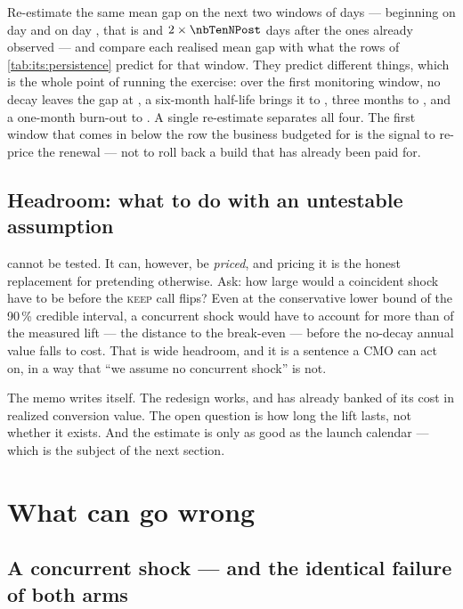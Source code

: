 Re-estimate the same mean gap on the next two windows of \nbTenNPost{} days --- beginning on day
\nbTenMonitorFirst{} and on day \nbTenMonitorSecond, that is \nbTenNPost{} and $2 \times
\nbTenNPost$ days after the ones already observed --- and compare each realised mean gap with what
the rows of \cref{tab:its:persistence} predict for that window. They predict different things, which
is the whole point of running the exercise: over the first monitoring window, no decay leaves the
gap at \pp{\nbTenBayesAvg}, a six-month half-life brings it to \pp{\nbTenMonitorGapSixm}, three
months to \pp{\nbTenMonitorGapThreem}, and a one-month burn-out to \pp{\nbTenMonitorGapOnem}. A
single re-estimate separates all four. The first window that comes in below the row the business
budgeted for is the signal to re-price the renewal --- not to roll back a build that has already
been paid for.

\subsection*{Headroom: what to do with an untestable assumption}

 cannot be tested. It can, however, be \emph{priced}, and pricing it is the
honest replacement for pretending otherwise. Ask: how large would a coincident shock have to be
before the \textsc{keep} call flips? Even at the conservative \pp{+\nbTenLiftLoNinety} lower bound
of the 90\,\% credible interval, a concurrent shock would have to account for more than
\pp{\nbTenHeadroomPp} of the measured lift --- the distance to the \pp{\nbTenBeLift} break-even ---
before the no-decay annual value falls to cost. That is wide headroom, and it is a sentence a CMO
can act on, in a way that ``we assume no concurrent shock'' is not.

The memo writes itself. The redesign works, and has already banked \pc{\nbTenEurRealizedPctCost} of
its cost in realized conversion value. The open question is how long the lift lasts, not whether it
exists. And the estimate is only as good as the launch calendar --- which is the subject of the
next section.

\section{What can go wrong}
\label{sec:its:wrong}

\subsection*{A concurrent shock --- and the identical failure of both arms}

